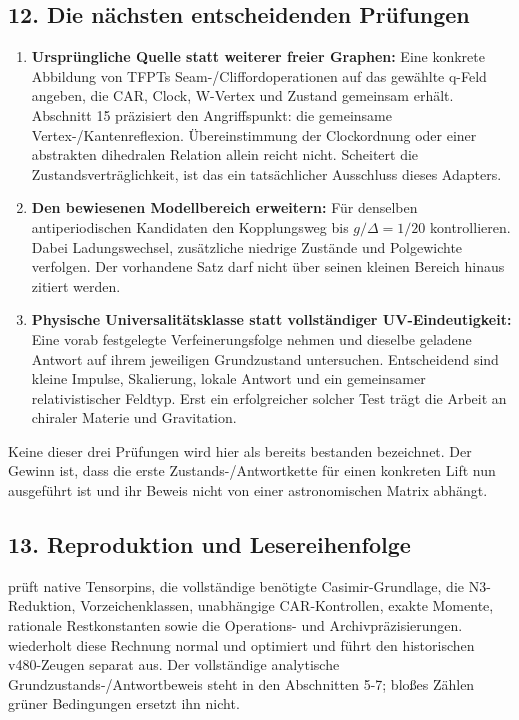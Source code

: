 \subsection{12. Die nächsten entscheidenden
Prüfungen}\label{die-nuxe4chsten-entscheidenden-pruxfcfungen}

\begin{enumerate}
\def\labelenumi{\arabic{enumi}.}
\tightlist
\item
  \textbf{Ursprüngliche Quelle statt weiterer freier Graphen:} Eine
  konkrete Abbildung von TFPTs Seam-/Cliffordoperationen auf das
  gewählte q-Feld angeben, die CAR, Clock, W-Vertex und Zustand
  gemeinsam erhält. Abschnitt 15 präzisiert den Angriffspunkt: die
  gemeinsame Vertex-/Kantenreflexion. Übereinstimmung der Clockordnung
  oder einer abstrakten dihedralen Relation allein reicht nicht.
  Scheitert die Zustandsverträglichkeit, ist das ein tatsächlicher
  Ausschluss dieses Adapters.
\item
  \textbf{Den bewiesenen Modellbereich erweitern:} Für denselben
  antiperiodischen Kandidaten den Kopplungsweg bis \(g/\Delta=1/20\)
  kontrollieren. Dabei Ladungswechsel, zusätzliche niedrige Zustände und
  Polgewichte verfolgen. Der vorhandene Satz darf nicht über seinen
  kleinen Bereich hinaus zitiert werden.
\item
  \textbf{Physische Universalitätsklasse statt vollständiger
  UV-Eindeutigkeit:} Eine vorab festgelegte Verfeinerungsfolge nehmen
  und dieselbe geladene Antwort auf ihrem jeweiligen Grundzustand
  untersuchen. Entscheidend sind kleine Impulse, Skalierung, lokale
  Antwort und ein gemeinsamer relativistischer Feldtyp. Erst ein
  erfolgreicher solcher Test trägt die Arbeit an chiraler Materie und
  Gravitation.
\end{enumerate}

Keine dieser drei Prüfungen wird hier als bereits bestanden bezeichnet.
Der Gewinn ist, dass die erste Zustands-/Antwortkette für einen
konkreten Lift nun ausgeführt ist und ihr Beweis nicht von einer
astronomischen Matrix abhängt.

\subsection{13. Reproduktion und
Lesereihenfolge}\label{reproduktion-und-lesereihenfolge}

 prüft native Tensorpins, die
vollständige benötigte Casimir-Grundlage, die N3-Reduktion,
Vorzeichenklassen, unabhängige CAR-Kontrollen, exakte Momente, rationale
Restkonstanten sowie die Operations- und Archivpräzisierungen.
 wiederholt diese Rechnung normal und optimiert und
führt den historischen v480-Zeugen separat aus. Der vollständige
analytische Grundzustands-/Antwortbeweis steht in den Abschnitten 5-7;
bloßes Zählen grüner Bedingungen ersetzt ihn nicht.

